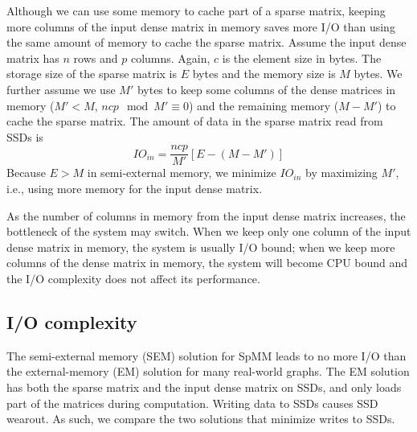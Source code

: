 Although we can use some memory to cache part of a sparse matrix,
keeping more columns of the input dense matrix in memory saves more I/O than
using the same amount of memory to cache the sparse matrix. Assume the input
dense matrix has $n$ rows and $p$ columns. Again, $c$ is the element size
in bytes. The storage size of the sparse
matrix is $E$ bytes and the memory size is $M$ bytes. We further assume
we use $M'$ bytes to keep some columns of the dense matrices in memory
($M' < M$, ${n c p} \mod {M'} \equiv 0$)
and the remaining memory ($M - M'$) to cache the sparse matrix.
The amount of data in the sparse matrix read from SSDs is
\begin{equation*}
IO_{in} = \frac{n c p}{M'} [E - (M - M')]
\end{equation*}
Because $E > M$ in semi-external memory, we minimize $IO_{in}$ by maximizing $M'$,
i.e., using more memory for the input dense matrix.

As the number of columns in memory from the input dense matrix increases,
the bottleneck of the system
may switch. When we keep only one column of the input dense matrix in memory,
the system is usually I/O bound; when we keep more columns of the dense matrix
in memory, the system will become CPU bound and the I/O complexity does not
affect its performance.


\subsection{I/O complexity}
The semi-external memory (SEM) solution for SpMM leads
to no more I/O than the external-memory (EM) solution for many real-world graphs.
The EM solution has both the sparse matrix and the input dense matrix on SSDs,
and only loads part of the matrices during computation. Writing data to SSDs
causes SSD wearout. As such, we compare the two solutions that minimize writes
to SSDs. %

